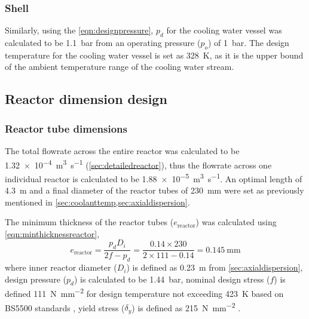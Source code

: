 \subsubsection{Shell}
Similarly, using the \cref{eqn:designpressure}, $p_d$ for the cooling water vessel was calculated to be \SI{1.1}{\bar} from an operating pressure ($p_o$) of \SI{1}{\bar}. The design temperature for the cooling water vessel is set as \SI{328}{\K}, as it is the upper bound of the ambient temperature range of the cooling water stream. 

\subsection{Reactor dimension design}
\label{sec:reactordimensions}

\subsubsection{Reactor tube dimensions}
\label{sec:reactortube}
The total flowrate across the entire reactor was calculated to be \SI{1.32e-4}{\cubic\m\per\s} (\cref{sec:detailedreactor}), thus the flowrate across one individual reactor is calculated to be  \SI{1.88e-5}{\cubic\m\per\s}. An optimal length of \SI{4.3}{\metre} and a final diameter of the reactor tubes of \SI{230}{\milli \metre} were set as previously mentioned in \cref{sec:coolanttemp,sec:axialdispersion}. 

The minimum thickness of the reactor tubes ($e_\mathrm{reactor}$) was calculated using \cref{eqn:minthicknessreactor},
\begin{equation}
    e_\mathrm{reactor} = \frac{p_dD_i}{2f-p_d} = \frac{0.14 \times 230}{2 \times 111 - 0.14} = \SI{0.145}{\mm}
    \label{eqn:minthicknessreactor}
\end{equation}
where inner reactor diameter ($D_i$) is defined as \SI{0.23}{\metre} from \cref{sec:axialdispersion}, design pressure ($p_d$) is calculated to be \SI{1.44}{\bar}, nominal design stress ($f$) is defined \SI{111}{\N\per\square\mm} for design temperature not exceeding \SI{423}{\K} based on BS5500 standards , yield stress ($\delta_y$) is defined as \SI{215}{\N\per\square\mm} \cite{noauthor_unfired_nodate}.


